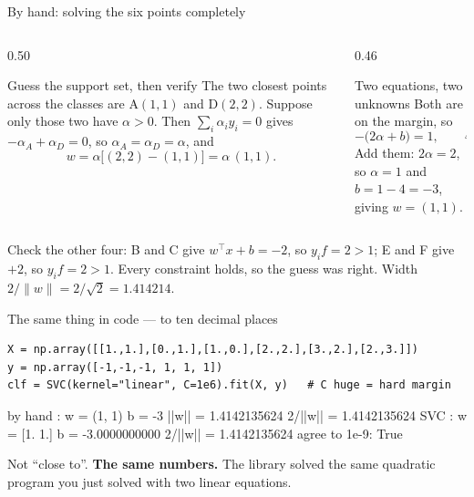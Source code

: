 \documentclass[aspectratio=169]{beamer}
\begin{document}
\begin{frame}[shrink=6]{By hand: solving the six points completely}
  \begin{columns}[T]
    \begin{column}{0.50\textwidth}
      \begin{block}{Guess the support set, then verify}
        The two closest points across the classes are A$(1,1)$ and D$(2,2)$.
        Suppose only those two have $\alpha > 0$. Then
        $\sum_i\alpha_i y_i = 0$ gives
        $-\alpha_A + \alpha_D = 0$, so $\alpha_A = \alpha_D = \alpha$, and
        \[
          w = \alpha\bigl[(2,2)-(1,1)\bigr] = \alpha\,(1,1).
        \]
      \end{block}
    \end{column}
    \begin{column}{0.46\textwidth}
      \begin{exampleblock}{Two equations, two unknowns}
        Both are on the margin, so
        \[
          -\bigl(2\alpha + b\bigr) = 1,
          \qquad
          4\alpha + b = 1 .
        \]
        Add them: $2\alpha = 2$, so $\boxed{\alpha = 1}$ and
        $b = 1 - 4 = \boxed{-3}$, giving $w = \boxed{(1,1)}$.
      \end{exampleblock}
    \end{column}
  \end{columns}
  \vspace{0.2em}
  \begin{center}\small
    Check the other four: B and C give $w^\top x + b = -2$, so
    $y_i f = 2 > 1$; E and F give $+2$, so $y_i f = 2 > 1$. Every constraint
    holds, so the guess was right. Width $2/\|w\| = 2/\sqrt2 = 1.414214$.
  \end{center}
\end{frame}

\begin{frame}[fragile,shrink=4]{The same thing in code --- to ten decimal places}
\begin{lstlisting}
X = np.array([[1.,1.],[0.,1.],[1.,0.],[2.,2.],[3.,2.],[2.,3.]])
y = np.array([-1,-1,-1, 1, 1, 1])
clf = SVC(kernel="linear", C=1e6).fit(X, y)   # C huge = hard margin
\end{lstlisting}
\begin{outblk}
by hand :  w = (1, 1)   b = -3
           ||w||   = 1.4142135624
           2/||w|| = 1.4142135624
SVC     :  w = [1. 1.]   b = -3.0000000000
           2/||w|| = 1.4142135624
agree to 1e-9: True
\end{outblk}
  \begin{center}\small
    Not ``close to''. \textbf{The same numbers.} The library solved the same
    quadratic program you just solved with two linear equations.
  \end{center}
\end{frame}
\end{document}
